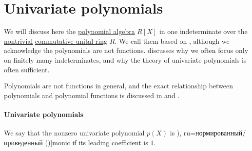 \section{Univariate polynomials}\label{sec:univariate_polynomials}

We will discuss here the \hyperref[def:polynomial_algebra]{polynomial algebra} \( R[X] \) in one indeterminate over the \hyperref[def:ring/trivial]{nontrivial} \hyperref[def:ring/commutative]{commutative unital ring} \( R \). We call them  based on , although we acknowledge the polynomials are not functions.  discusses why we often focus only on finitely many indeterminates, and why the theory of univariate polynomials is often sufficient.

Polynomials are not functions in general, and the exact relationship between polynomials and polynomial functions is discussed in  and .

\paragraph{Univariate polynomials}

\begin{definition}\label{def:monic_polynomial}
  We say that the nonzero univariate polynomial \( p(X) \) is \term[bg=нормиран (\cite[29]{ГеновМиховскиМоллов1991Алгебра}), ru=нормированный/приведенный (\cite[102]{Винберг2014Алгебра})]{monic} if its leading coefficient is \( 1 \).
\end{definition}

